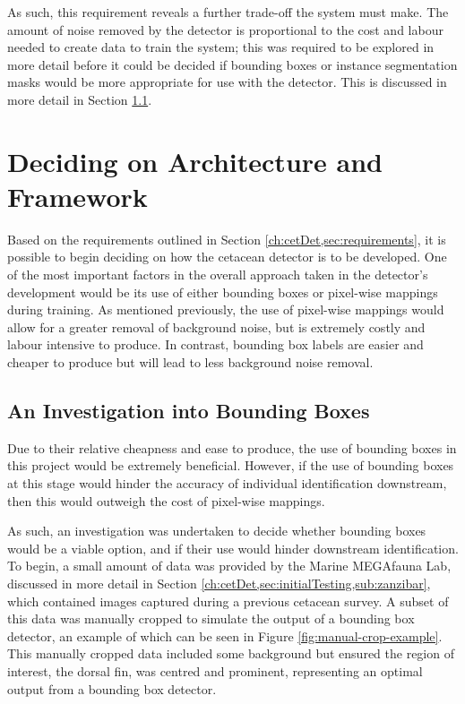  As such, this requirement reveals a further trade-off the system must make. The amount of noise removed by the detector is proportional to the cost and labour needed to create data to train the system; this was required to be explored in more detail before it could be decided if bounding boxes or instance segmentation masks would be more appropriate for use with the detector. This is discussed in more detail in Section \ref{ch:cetDet,sec:deciding,sub:boundingBoxInvestigation}.
 
\section{Deciding on Architecture and Framework}\label{ch:cetDet,sec:deciding}

Based on the requirements outlined in Section \ref{ch:cetDet,sec:requirements}, it is possible to begin deciding on how the cetacean detector is to be developed. One of the most important factors in the overall approach taken in the detector's development would be its use of either bounding boxes or pixel-wise mappings during training. As mentioned previously, the use of pixel-wise mappings would allow for a greater removal of background noise, but is extremely costly and labour intensive to produce. In contrast, bounding box labels are easier and cheaper to produce but will lead to less background noise removal. 

\subsection{An Investigation into Bounding Boxes}\label{ch:cetDet,sec:deciding,sub:boundingBoxInvestigation}

Due to their relative cheapness and ease to produce, the use of bounding boxes in this project would be extremely beneficial. However, if the use of bounding boxes at this stage would hinder the accuracy of individual identification downstream, then this would outweigh the cost of pixel-wise mappings. 

As such, an investigation was undertaken to decide whether bounding boxes would be a viable option, and if their use would hinder downstream identification. To begin, a small amount of data was provided by the Marine MEGAfauna Lab, discussed in more detail in Section \ref{ch:cetDet,sec:initialTesting,sub:zanzibar}, which contained images captured during a previous cetacean survey. A subset of this data was manually cropped to simulate the output of a bounding box detector, an example of which can be seen in Figure \ref{fig:manual-crop-example}. This manually cropped data included some background but ensured the region of interest, the dorsal fin, was centred and prominent, representing an optimal output from a bounding box detector. 

